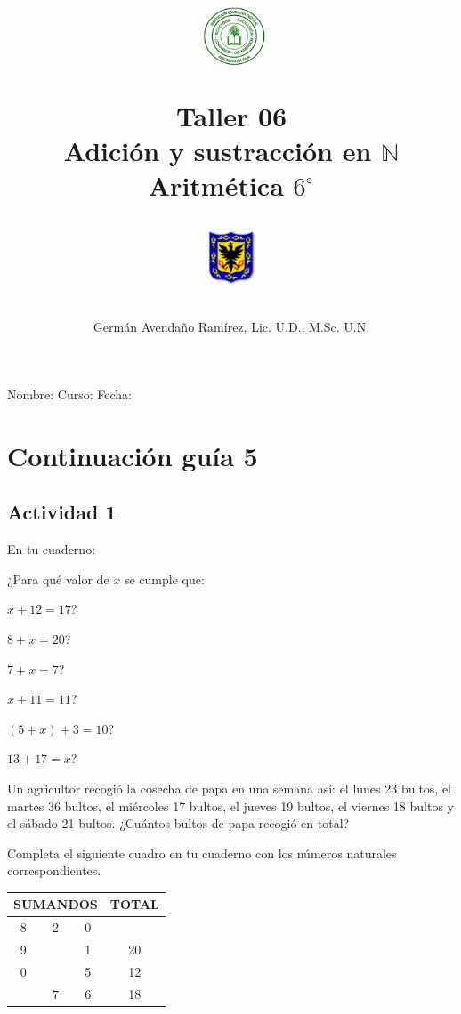 \documentclass[10pt,twoside]{article}
\author{Germ\'an Avenda\~no Ram\'irez, Lic. U.D., M.Sc. U.N.}
\title{\begin{minipage}{.2\textwidth}
\includegraphics[height=1.75cm]{Images/logo-colegio.png}\end{minipage}
\begin{minipage}{.55\textwidth}
\begin{center}
Taller 06\\Adición y sustracción en $\mathbb{N}$  \\
Aritmética $6^{\circ}$
\end{center}
\end{minipage}\hfill
\begin{minipage}{.2\textwidth}
\includegraphics[height=1.75cm]{Images/logo-sed.png} 
\end{minipage}}
\date{}
\begin{document}
\maketitle
Nombre: \hrulefill Curso: \underline{\hspace*{44pt}} Fecha: \underline{\hspace*{2.5cm}}\\
\section*{Continuaci\'on gu\'ia 5}
\subsection*{Actividad 1}
En tu cuaderno:
\begin{enumerate}
\item ¿Para qué valor de $x$ se cumple que:
\begin{enumerate}
\begin{multicols}{2}
\item $x+12=17$?
\item $8+x=20$?
\item $7+x=7$?
\item $x+11=11$?
\item $(5+x)+3=10$?
\item $13+17=x$?
\end{multicols}
\end{enumerate}
\item Un agricultor recogió la cosecha de papa en una semana así: el lunes 23 bultos, el martes 36 bultos, el miércoles 17 bultos, el jueves 19 bultos, el viernes 18 bultos y el sábado 21 bultos. ¿Cuántos bultos de papa recogió en total?

\begin{minipage}{0.45\textwidth}
\item Completa el siguiente cuadro en tu cuaderno con los números naturales
correspondientes.
\end{minipage}\hfill
\begin{minipage}{.45\textwidth}
\begin{tabular}{|c|c|c|c|}
\hline 
\multicolumn{3}{|c|}{SUMANDOS} & TOTAL \\ 
\hline 
8 & 2 & 0 &  \\ 
\hline 
9 &  & 1 & 20 \\ 
\hline 
0 &  & 5 & 12 \\ 
\hline 
 & 7 & 6 & 18 \\ 
\hline 
\end{tabular} 
\end{minipage}


\end{enumerate}
\end{document}
